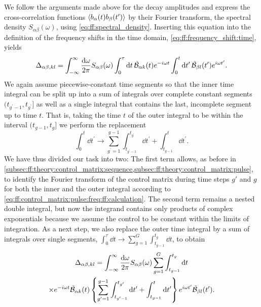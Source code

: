 We follow the arguments made above for the decay amplitudes and express the cross-correlation functions $\ev{b_\alpha(t) b_\beta(t^\prime)}$ by their Fourier transform, the spectral density $S_{\alpha\beta}(\omega)$, using \cref{eq:ff:spectral_density}.
Inserting this equation into the definition of the frequency shifts in the time domain, \cref{eq:ff:frequency_shift:time}, yields
\begin{equation}\label{eq:ff:frequency_shifts:time}
    \Delta_{\alpha\beta,kl} = \int_{-\infty}^\infty\frac{\dd{\omega}}{2\pi} S_{\alpha\beta}(\omega)
        \int_0^\tau\dd{t}\tilde{\mathcal{B}}_{\alpha k}(t)e^{-i\omega t}
        \int_0^t\dd{t^\prime}\tilde{\mathcal{B}}_{\beta l}(t^\prime)e^{i\omega t^\prime}.
\end{equation}
We again assume piecewise-constant time segments so that the inner time integral can be split up into a sum of integrals over complete constant segments $(t_{g^\prime-1},t_{g^\prime}]$ as well as a single integral that contains the last, incomplete segment up to time $t$.
That is, taking the time $t$ of the outer integral to be within the interval $(t_{g-1}, t_g]$ we perform the replacement
\begin{equation}
    \int_0^t\dd{t^\prime} \rightarrow \sum_{g^\prime=1}^{g-1}\int_{t_{g^\prime-1}}^{t_{g^\prime}}\dd{t^\prime} + \int_{t_{g-1}}^{t}\dd{t^\prime}.
\end{equation}
We have thus divided our task into two: The first term allows, as before in \cref{subsec:ff:theory:control_matrix:sequence,subsec:ff:theory:control_matrix:pulse}, to identify the Fourier transform of the control matrix during time steps $g'$ and $g$ for both the inner and the outer integral according to \cref{eq:ff:control_matrix:pulse:freq:ff:calculation}.
The second term remains a nested double integral, but now the integrand contains only products of complex exponentials because we assume the control to be constant within the limits of integration.
As a next step, we also replace the outer time integral by a sum of integrals over single segments, $\int_0^\tau\dd{t}\rightarrow\sum_{g=1}^G\int_{t_{g-1}}^{t_g}\dd{t}$, to obtain
\begin{multline}\label{eq:ff:frequency_shifts:time:substituted}
    \Delta_{\alpha\beta,kl} = \int_{-\infty}^\infty\frac{\dd{\omega}}{2\pi} S_{\alpha\beta}(\omega)
        \sum_{g=1}^{G}\int_{t_{g-1}}^{t_{g}}\dd{t} \\
        \times e^{-i\omega t}\tilde{\mathcal{B}}_{\alpha k}(t)
        \left\lbrace\sum_{g^\prime=1}^{g-1}\int_{t_{g^\prime-1}}^{t_{g^\prime}}\dd{t^\prime} + \int_{t_{g-1}}^{t}\dd{t^\prime}\right\rbrace
        e^{i\omega t^\prime}\tilde{\mathcal{B}}_{\beta l}(t').
\end{multline}
